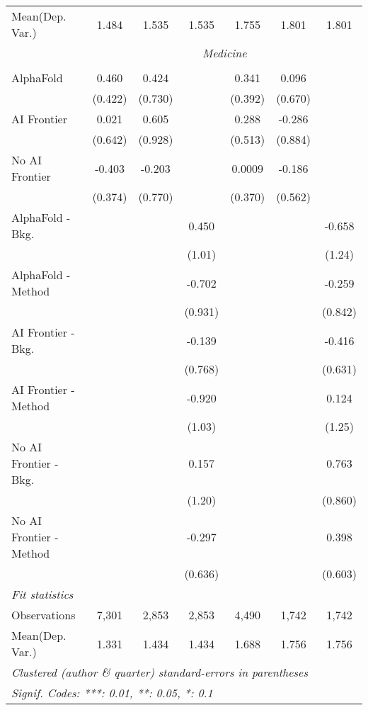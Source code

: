 \begin{tabular}{lcccccc}
Mean(Dep. Var.) & 1.484 & 1.535 & 1.535 & 1.755 & 1.801 & 1.801 \\
 & \multicolumn{6}{c}{\textit{Medicine}} \\ \\
   AlphaFold               & 0.460   & 0.424   &         & 0.341   & 0.096   &   \\   
                           & (0.422) & (0.730) &         & (0.392) & (0.670) &   \\   
   AI Frontier             & 0.021   & 0.605   &         & 0.288   & -0.286  &   \\   
                           & (0.642) & (0.928) &         & (0.513) & (0.884) &   \\   
   No AI Frontier          & -0.403  & -0.203  &         & 0.0009  & -0.186  &   \\   
                           & (0.374) & (0.770) &         & (0.370) & (0.562) &   \\   
   AlphaFold - Bkg.        &         &         & 0.450   &         &         & -0.658\\   
                           &         &         & (1.01)  &         &         & (1.24)\\   
   AlphaFold - Method      &         &         & -0.702  &         &         & -0.259\\   
                           &         &         & (0.931) &         &         & (0.842)\\   
   AI Frontier - Bkg.      &         &         & -0.139  &         &         & -0.416\\   
                           &         &         & (0.768) &         &         & (0.631)\\   
   AI Frontier - Method    &         &         & -0.920  &         &         & 0.124\\   
                           &         &         & (1.03)  &         &         & (1.25)\\   
   No AI Frontier - Bkg.   &         &         & 0.157   &         &         & 0.763\\   
                           &         &         & (1.20)  &         &         & (0.860)\\   
   No AI Frontier - Method &         &         & -0.297  &         &         & 0.398\\   
                           &         &         & (0.636) &         &         & (0.603)\\   
   \midrule
   \emph{Fit statistics}\\
   Observations            & 7,301   & 2,853   & 2,853   & 4,490   & 1,742   & 1,742\\  
Mean(Dep. Var.) & 1.331 & 1.434 & 1.434 & 1.688 & 1.756 & 1.756 \\
   \midrule \midrule
   \multicolumn{7}{l}{\emph{Clustered (author \& quarter) standard-errors in parentheses}}\\
   \multicolumn{7}{l}{\emph{Signif. Codes: ***: 0.01, **: 0.05, *: 0.1}}\\
\end{tabular}
\par\endgroup
